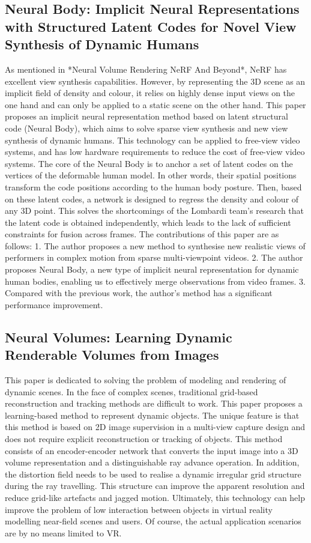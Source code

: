 \documentclass[UTF-8]{ctexart}
\begin{document}
\subsection{Neural Body: Implicit Neural Representations with Structured Latent Codes for Novel View Synthesis of Dynamic Humans}
As mentioned in *Neural Volume Rendering NeRF And Beyond*, NeRF has excellent view synthesis capabilities. However, by representing the 3D scene as an implicit field of density and colour, it relies on highly dense input views on the one hand and can only be applied to a static scene on the other hand. This paper proposes an implicit neural representation method based on latent structural code (Neural Body), which aims to solve sparse view synthesis and new view synthesis of dynamic humans. This technology can be applied to free-view video systems, and has low hardware requirements to reduce the cost of free-view video systems. The core of the Neural Body is to anchor a set of latent codes on the vertices of the deformable human model. In other words, their spatial positions transform the code positions according to the human body posture. Then, based on these latent codes, a network is designed to regress the density and colour of any 3D point. This solves the shortcomings of the Lombardi team's research that the latent code is obtained independently, which leads to the lack of sufficient constraints for fusion across frames. The contributions of this paper are as follows: 1. The author proposes a new method to synthesise new realistic views of performers in complex motion from sparse multi-viewpoint videos. 2. The author proposes Neural Body, a new type of implicit neural representation for dynamic human bodies, enabling us to effectively merge observations from video frames. 3. Compared with the previous work, the author's method has a significant performance improvement.

\subsection{Neural Volumes: Learning Dynamic Renderable Volumes from Images}
This paper is dedicated to solving the problem of modeling and rendering of dynamic scenes. In the face of complex scenes, traditional grid-based reconstruction and tracking methods are difficult to work. This paper proposes a learning-based method to represent dynamic objects. The unique feature is that this method is based on 2D image supervision in a multi-view capture design and does not require explicit reconstruction or tracking of objects. This method consists of an encoder-encoder network that converts the input image into a 3D volume representation and a distinguishable ray advance operation. In addition, the distortion field needs to be used to realise a dynamic irregular grid structure during the ray travelling. This structure can improve the apparent resolution and reduce grid-like artefacts and jagged motion. Ultimately, this technology can help improve the problem of low interaction between objects in virtual reality modelling near-field scenes and users. Of course, the actual application scenarios are by no means limited to VR.
\end{document}
